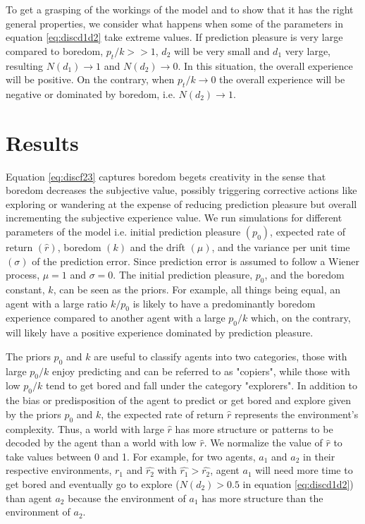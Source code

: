 \documentclass[11pt, onecolumn]{article}
\begin{document}
To get a grasping of the workings of the model and to show that it has the right general properties, we consider what happens when some of the parameters in  equation \ref{eq:discd1d2} take extreme values. If prediction pleasure is very large compared to boredom, $p_t/k >> 1$, $d_2$ will be very small and $d_1$ very large, resulting $N(d_1) \to 1$ and $N(d_2) \to 0$. In this situation, the overall experience will be positive. On the contrary, when $p_t/k \to 0$ the overall experience  will be negative or dominated by boredom, i.e. $N(d_2) \to 1$. 


\section{Results}
\label{se:re}
Equation \ref{eq:discf23} captures boredom begets creativity in the sense that boredom decreases the subjective value, possibly triggering corrective actions like exploring or wandering at the expense of reducing prediction pleasure but overall incrementing the subjective experience value.
We run simulations for different parameters of the model i.e. initial prediction pleasure $(p_0)$, expected rate of return $(\hat{r})$, boredom $(k)$ and the drift $(\mu)$, and the variance per unit time $(\sigma)$ of the prediction error. Since  prediction error is assumed to follow a Wiener process, $\mu = 1$ and $\sigma = 0$. 
The initial prediction pleasure, $p_0$, and the boredom constant, $k$, can be seen as the priors. For example, all things being equal, an agent with a large ratio $k/p_0$ is likely to have a predominantly boredom experience compared to another agent with a large $p_0/k$ which, on the contrary, will likely have a positive experience dominated by prediction pleasure. 

The priors $p_0$ and $k$ are useful to classify agents into two categories, those with large $p_0/k$ enjoy predicting and can be referred to as "copiers", while those with low $p_0/k$ tend to get bored and fall under the category "explorers". 
In addition to the bias or predisposition of the agent to predict or get bored and explore given by the priors $p_0$ and $k$, the expected rate of return $\hat{r}$ represents the environment's complexity. Thus, a world with large $\hat{r}$ has more structure or patterns to be decoded by the agent than a world with low $\hat{r}$. We normalize the value of $\hat{r}$ to take values between 0 and 1.
For example, for two agents, $a_1$ and $a_2$ in their respective environments, $\hat{r_1}$ and $\hat{r_2}$ with $\hat{r_1} > \hat{r_2}$, agent $a_1$ will need more time to get bored and eventually go to explore ($N(d_2) > 0.5$ in equation \ref{eq:discd1d2}) than agent $a_2$ because the environment of $a_1$ has more structure than the environment of $a_2$.
\end{document}
